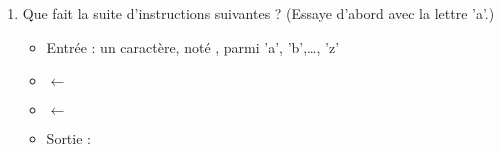 \documentclass[class=report,crop=false, 12pt]{standalone}
\begin{document}
\begin{activite}
\begin{enumerate}
\begin{enumerate}
    \item  Que fait la suite d'instructions suivantes ? (Essaye d'abord avec la lettre 'a'.)     
    \begin{itemize}
      \item Entrée : un caractère, noté , parmi 'a', 'b',\ldots, 'z'
      \item {} $\leftarrow$ 
      \item {} $\leftarrow$ 
      \item Sortie : 
    \end{itemize}
    
  \end{enumerate}  
  
\end{enumerate}
\vspace*{-1ex}
\end{activite}
\end{document}
